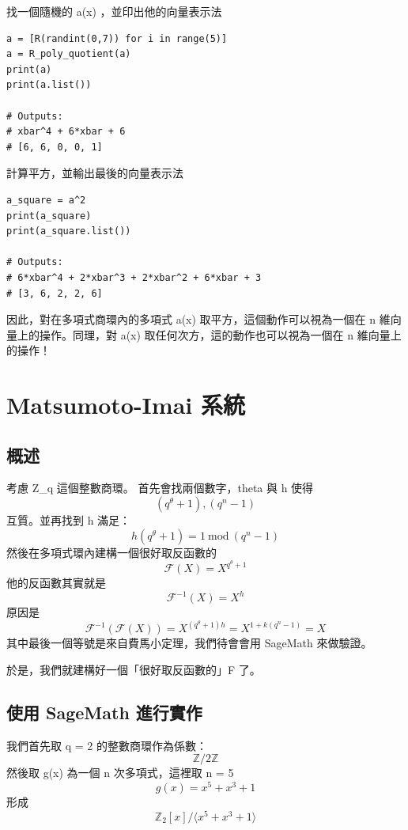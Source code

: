 \documentclass[
]{article}
\begin{document}
找一個隨機的 a(x) ，並印出他的向量表示法

\begin{verbatim}
a = [R(randint(0,7)) for i in range(5)]
a = R_poly_quotient(a)
print(a)
print(a.list())

# Outputs:
# xbar^4 + 6*xbar + 6
# [6, 6, 0, 0, 1]
\end{verbatim}

計算平方，並輸出最後的向量表示法

\begin{verbatim}
a_square = a^2
print(a_square)
print(a_square.list())

# Outputs:
# 6*xbar^4 + 2*xbar^3 + 2*xbar^2 + 6*xbar + 3
# [3, 6, 2, 2, 6]
\end{verbatim}

因此，對在多項式商環內的多項式 a(x) 取平方，這個動作可以視為一個在 n
維向量上的操作。同理，對 a(x) 取任何次方，這的動作也可以視為一個在 n
維向量上的操作！

\hypertarget{matsumoto-imai-ux7cfbux7d71}{%
\section{Matsumoto-Imai 系統}\label{matsumoto-imai-ux7cfbux7d71}}

\hypertarget{ux6982ux8ff0}{%
\subsection{概述}\label{ux6982ux8ff0}}

考慮 Z\_q 這個整數商環。 首先會找兩個數字，theta 與 h 使得 \[
(q^{\theta}+1), (q^n-1)
\] 互質。並再找到 h 滿足： \[
h(q^{\theta}+1) = 1 \ \mathrm{mod} \ (q^{n}-1 )
\] 然後在多項式環內建構一個很好取反函數的 \[
\mathcal{F}(X) = X^{q^{\theta}+1}
\] 他的反函數其實就是 \[
\mathcal{F}^{-1}(X) = X^{h}
\] 原因是 \[
\mathcal{F}^{-1}(\mathcal{F}(X)) = X^{(q^{\theta}+1)h} = X^{1+k(q^{n}-1)} =X
\] 其中最後一個等號是來自費馬小定理，我們待會會用 SageMath 來做驗證。

於是，我們就建構好一個「很好取反函數的」F 了。

\hypertarget{ux4f7fux7528-sagemath-ux9032ux884cux5be6ux4f5c}{%
\subsection{使用 SageMath
進行實作}\label{ux4f7fux7528-sagemath-ux9032ux884cux5be6ux4f5c}}

我們首先取 q = 2 的整數商環作為係數： \[
\mathbb{Z} / 2\mathbb{Z}
\] 然後取 g(x) 為一個 n 次多項式，這裡取 n = 5 \[
g(x) = x^5 + x^3 + 1
\] 形成 \[
\mathbb{Z}_{2}[x] / \langle x^5 + x^3 + 1\rangle
\]
\end{document}
